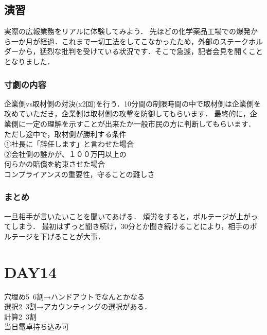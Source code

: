 \documentclass[a4paper,11pt]{ltjsarticle}
\begin{document}
\subsection{演習}
実際の広報業務をリアルに体験してみよう．
先ほどの化学薬品工場での爆発から一か月が経過．これまで一切工法をしてこなかったため，外部のステークホルダーから，猛烈な批判を受けている状況です．そこで急遽，記者会見を開くこととなりました．
\subsubsection{寸劇の内容}
企業側vs取材側の対決(x2回)を行う．10分間の制限時間の中で取材側は企業側を攻めていただき，企業側は取材側の攻撃を防御してもらいます．
最終的に，企業側に一定の理解を示すことが出来たか一般市民の方に判断してもらいます．
ただし途中で，取材側が勝利する条件\\
➀社長に「辞任します」と言わせた場合\\
➁会社側の誰かが、１００万円以上の\\
何らかの賠償を約束させた場合\\
コンプライアンスの重要性，守ることの難しさ
\subsubsection{まとめ}
一旦相手が言いたいことを聞いてあげる．
煩労をすると，ボルテージが上がってしまう．
最初はずっと聞き続け，30分とか聞き続けることにより，相手のボルテージを下げることが大事．
\section{DAY14}
穴埋め5~6割→ハンドアウトでなんとかなる\\
選択2~3割→アカウンティングの選択がある．\\
計算2~3割\\
当日電卓持ち込み可
\end{document}

